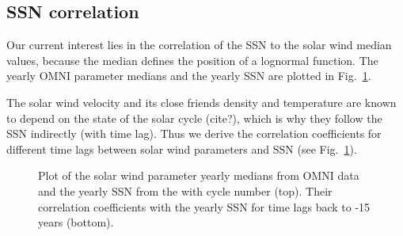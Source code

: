 
\subsection{SSN correlation}
Our current interest lies in the correlation of the SSN to the solar wind median values, because the median defines the position of a lognormal function. The yearly OMNI parameter medians and the yearly SSN are plotted in Fig.~\ref{fig:OMNI_yearly_ssn_correlation_c_plot}.

The solar wind velocity and its close friends density and temperature are known to depend on the state of the solar cycle (cite?), which is why they follow the SSN indirectly (with time lag). Thus we derive the correlation coefficients for different time lags between solar wind parameters and SSN (see Fig.~\ref{fig:OMNI_yearly_ssn_correlation_c_plot}).
\begin{figure}
	\caption{Plot of the solar wind parameter yearly medians from OMNI data and the yearly SSN from the \citet{sidc} with cycle number (top). Their correlation coefficients with the yearly SSN for time lags back to -15 years (bottom).}
	\label{fig:OMNI_yearly_ssn_correlation_c_plot}
\end{figure}


